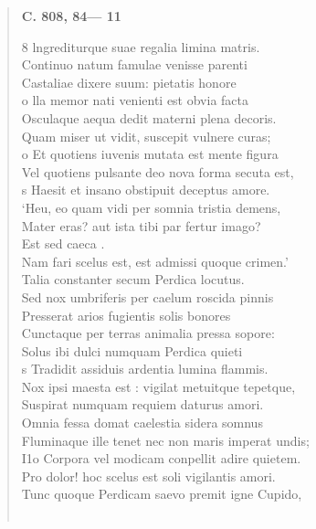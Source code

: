 \documentclass[11pt, a4paper]{report}
\begin{document}
\begin{verse}
    \begin{center} \textbf{C. 808, 84— 11} \end{center} \marginpar{[289]} 8 lngrediturque suae regalia limina matris. \\ Continuo natum famulae venisse parenti \\ Castaliae dixere suum: pietatis honore \\ o lla memor nati venienti est obvia facta \\ Osculaque aequa dedit materni plena decoris. \\ Quam miser ut vidit, suscepit vulnere curas; \\ o Et quotiens iuvenis mutata est mente figura \\ Vel quotiens pulsante deo nova forma secuta est, \\ s Haesit et insano obstipuit deceptus amore. \\ ‘Heu, eo quam vidi per somnia tristia demens, \\ Mater eras? aut ista tibi par fertur imago? \\ Est sed caeca . \\ Nam fari scelus est,  \lbrack est \rbrack  admissi quoque crimen.’ \\ Talia constanter secum Perdica locutus. \\ Sed nox umbriferis per caelum roscida pinnis \\ Presserat arios fugientis solis bonores \\ Cunctaque per terras animalia pressa sopore: \\ Solus ibi dulci numquam Perdica quieti \\ s Tradidit assiduis ardentia lumina flammis. \\ Nox ipsi maesta  \lbrack est \rbrack : vigilat metuitque tepetque, \\ Suspirat numquam requiem daturus amori. \\ Omnia fessa domat caelestia sidera somnus \\ Fluminaque  \lbrack ille tenet nec non maris imperat undis; \\ I1o Corpora vel modicam conpellit adire quietem. \\ Pro dolor! hoc scelus est soli vigilantis amori. \\ Tunc quoque Perdicam  \lbrack saevo \rbrack  premit igne Cupido, \\ 
        ﻿\pagebreak 

\end{verse}
\end{document}
